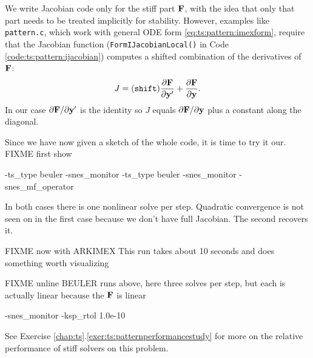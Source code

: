 We write Jacobian code only for the stiff part $\mathbf{F}$, with the idea that only that part needs to be treated implicitly for stability.  However, examples like \texttt{pattern.c}, which work with general ODE form \eqref{eq:ts:pattern:imexform}, require that the Jacobian function (\texttt{FormIJacobianLocal()} in Code \ref{code:ts:pattern:ijacobian}) computes a shifted combination of the derivatives of $\mathbf{F}$:
\begin{equation}
J = (\text{\texttt{shift}}) \frac{\partial \mathbf{F}}{\partial \mathbf{y}'} + \frac{\partial \mathbf{F}}{\partial \mathbf{y}}.
\label{eq:ts:pattern:jacobianshift}
\end{equation}
In our case $\partial \mathbf{F}/\partial \mathbf{y}'$ is the identity so $J$ equals $\partial \mathbf{F}/\partial \mathbf{y}$ plus a constant along the diagonal.

Since we have now given a sketch of the whole code, it is time to try it our.  FIXME first show
\begin{cline}
-ts_type beuler -snes_monitor
-ts_type beuler -snes_monitor -snes_mf_operator
\end{cline}
In both cases there is one nonlinear solve per step.  Quadratic convergence is not seen on in the first case because we don't have full Jacobian.  The second recovers it.

FIXME now with ARKIMEX This run takes about 10 seconds and does something worth visualizing
FIXME unline BEULER runs above, here three \pSNES solves per step, but each is actually linear because the $\mathbf{F}$ is linear
\begin{cline}
-snes_monitor -ksp_rtol 1.0e-10
\end{cline}

See Exercise \ref{chap:ts}.\ref{exer:ts:patternperformancestudy} for more on the relative performance of stiff solvers on this problem.


